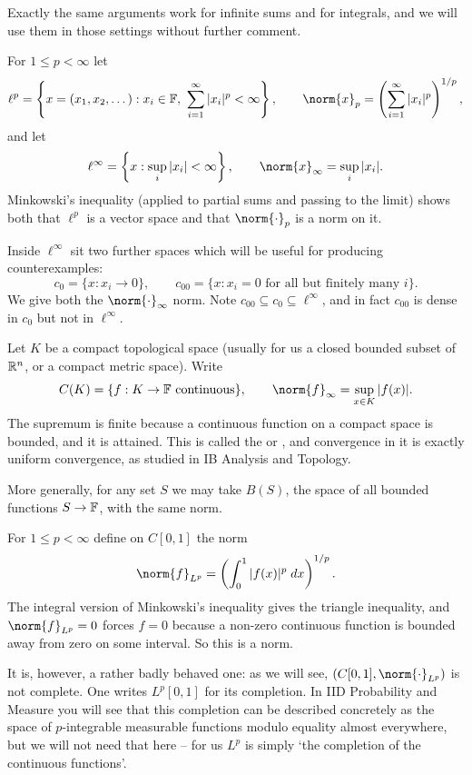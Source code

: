 \documentclass[a4paper]{scrartcl}
\begin{document}
Exactly the same arguments work for infinite sums and for integrals, and we will use them in those settings without further comment.

\begin{example}
	For $1 \leq p < \infty$ let
	$$\ell^p = \left\{ x = (x_1, x_2, \dots) : x_i \in \F, \ \sum_{i=1}^\infty |x_i|^p < \infty \right\}, \qquad \norm{x}_p = \left( \sum_{i=1}^\infty |x_i|^p \right)^{1/p},$$
	and let
	$$\ell^\infty = \left\{ x : \sup_i |x_i| < \infty \right\}, \qquad \norm{x}_\infty = \sup_i |x_i|.$$
	Minkowski's inequality (applied to partial sums and passing to the limit) shows both that $\ell^p$ is a vector space and that $\norm{\cdot}_p$ is a norm on it.

	Inside $\ell^\infty$ sit two further spaces which will be useful for producing counterexamples:
	$$c_0 = \{ x : x_i \to 0 \}, \qquad c_{00} = \{ x : x_i = 0 \text{ for all but finitely many } i \}.$$
	We give both the $\norm{\cdot}_\infty$ norm. Note $c_{00} \subseteq c_0 \subseteq \ell^\infty$, and in fact $c_{00}$ is dense in $c_0$ but not in $\ell^\infty$.
\end{example}

\begin{example}
	Let $K$ be a compact topological space (usually for us a closed bounded subset of $\mathbb{R}^n$, or a compact metric space). Write
	$$C(K) = \{ f : K \to \F \ \text{continuous} \}, \qquad \norm{f}_\infty = \sup_{x \in K} |f(x)|.$$
	The supremum is finite because a continuous function on a compact space is bounded, and it is attained. This is called the  or , and convergence in it is exactly uniform convergence, as studied in IB Analysis and Topology.

	More generally, for any set $S$ we may take $B(S)$, the space of all bounded functions $S \to \mathbb{F}$, with the same norm.
\end{example}

\begin{example}[$L^p$ spaces]
	For $1 \leq p < \infty$ define on $C[0,1]$ the norm
	$$\norm{f}_{L^p} = \left( \int_0^1 |f(x)|^p \dd x \right)^{1/p}.$$
	The integral version of Minkowski's inequality gives the triangle inequality, and $\norm{f}_{L^p} = 0$ forces $f = 0$ because a non-zero continuous function is bounded away from zero on some interval. So this is a norm.

	It is, however, a rather badly behaved one: as we will see, $(C[0,1], \norm{\cdot}_{L^p})$ is not complete. One writes $L^p[0,1]$ for its completion. In IID Probability and Measure you will see that this completion can be described concretely as the space of $p$-integrable measurable functions modulo equality almost everywhere, but we will not need that here -- for us $L^p$ is simply `the completion of the continuous functions'.
\end{example}
\end{document}
